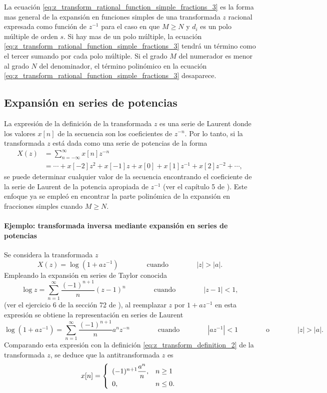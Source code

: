 \documentclass[a4paper]{report}
\begin{document}
La ecuación \ref{eq:z_transform_rational_function_simple_fractions_3} es la forma mas general de la expansión en funciones simples de una transformada \(z\) racional expresada como función de \(z^{-1}\) para el caso en que \(M\geq N\) y \(d_i\) es un polo múltiple de orden \(s\). Si hay mas de un polo múltiple, la ecuación \ref{eq:z_transform_rational_function_simple_fractions_3} tendrá un término como el tercer sumando por cada polo múltiple. Si el grado \(M\) del numerador es menor al grado \(N\) del denominador, el término polinómico en la ecuación \ref{eq:z_transform_rational_function_simple_fractions_3} desaparece.
 
\subsection{Expansión en series de potencias} 
 
La expresión de la definición de la transformada \(z\) es una serie de Laurent donde los valores \(x[n]\) de la secuencia son los coeficientes de \(z^{-n}\). Por lo tanto, si la transformada \(z\) está dada como una serie de potencias de la forma
\begin{equation}\label{eq:z_transform_definition_2}
 \begin{aligned}
  X(z)&=\sum_{n=-\infty}^\infty x[n]z^{-n}\\
  &=\cdots+x[-2]z^2+x[-1]z+x[0]+x[1]z^{-1}+x[2]z^{-2}+\cdots,
 \end{aligned}
\end{equation}
se puede determinar cualquier valor de la secuencia encontrando el coeficiente de la serie de Laurent de la potencia apropiada de \(z^{-1}\) (ver el capítulo 5 de \cite{brown2013complex}). Este enfoque ya se empleó en encontrar la  parte polinómica de la expansión en fracciones simples cuando \(M\geq N\).

\paragraph{Ejemplo: transformada inversa mediante expansión en series de potencias} Se considera la transformada \(z\) 
\[
 X(z)=\log(1+az^{-1})
 \qquad\qquad\textrm{cuando}\qquad\qquad
 |z|>|a|.
\]
Empleando la expansión en series de Taylor conocida
\[
 \log z=\sum_{n=1}^\infty\frac{(-1)^{n+1}}{n}(z-1)^n
 \qquad\qquad\textrm{cuando}\qquad\qquad
 |z-1|<1,
\]
(ver el ejercicio 6 de la sección 72 de \cite{brown2013complex}), al reemplazar \(z\) por \(1+az^{-1}\) en esta expresión se obtiene la representación en series de Laurent
\[
 \log(1+az^{-1})=\sum_{n=1}^\infty\frac{(-1)^{n+1}}{n}a^nz^{-n}
 \qquad\qquad\textrm{cuando}\qquad\qquad
 |az^{-1}|<1
 \qquad\qquad\textrm{o}\qquad\qquad
 |z|>|a|.
\]
Comparando esta expresión con la definición \ref{eq:z_transform_definition_2} de la transformada \(z\), se deduce que la antitransformada \(z\) es 
\[
 x[n]=
 \left\{
 \begin{array}{ll}
  (-1)^{n+1}\dfrac{a^n}{n}, & n\geq1\\[\medskipamount]
  0, & n\leq0.
 \end{array}
 \right.
\]
\end{document}
